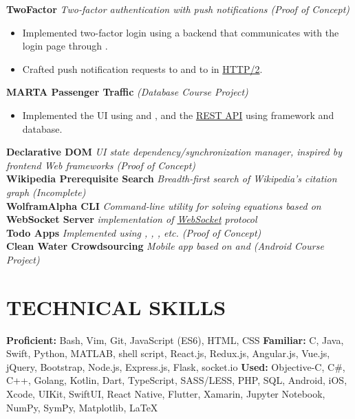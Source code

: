 \documentclass[11pt]{article}
\begin{document}
\vspace{0.5em}
%
\textbf{TwoFactor} \enspace \textit{Two-factor authentication with push notifications (Proof of Concept)}
\begin{itemize}[leftmargin=15pt, noitemsep, topsep=0pt]
\item Implemented two-factor login using a \underline{} backend that communicates with the login page through \underline{}.
\item Crafted push notification requests to \underline{} and to \underline{} in \underline{HTTP/2}.
\end{itemize}
\vspace{0.5em}
%
\textbf{MARTA Passenger Traffic} \enspace \textit{(Database Course Project)}
\begin{itemize}[leftmargin=15pt, noitemsep, topsep=0pt]
\item Implemented the UI using \underline{} and \underline{}, and the \underline{REST API} using \underline{} framework and \underline{} database.
\end{itemize}
\vspace{0.5em}
%
\textbf{Declarative DOM} \enspace \textit{UI state dependency/synchronization manager, inspired by frontend Web frameworks (Proof of Concept)}\\
\textbf{Wikipedia Prerequisite Search} \enspace \textit{Breadth-first search of Wikipedia's citation graph (Incomplete)}\\
\textbf{WolframAlpha CLI} \enspace \textit{Command-line utility for solving equations based on \underline{}}\\
\textbf{WebSocket Server}  \enspace \textit{\underline{} implementation of \underline{WebSocket} protocol}\\
\textbf{Todo Apps} \enspace \textit{Implemented using \underline{}\underline{}, \underline{}, \underline{}, etc. (Proof of Concept)}\\
\textbf{Clean Water Crowdsourcing}	\enspace \textit{Mobile app based on \underline{} and \underline{} (Android Course Project) }
\vspace{-0.5em}

\section*{TECHNICAL SKILLS}
\textbf{Proficient:} Bash, Vim, Git, JavaScript (ES6), HTML, CSS  \enspace\textbf{Familiar:} C, Java, Swift, Python, MATLAB, shell script, React.js, Redux.js, Angular.js, Vue.js, jQuery, Bootstrap, Node.js, Express.js, Flask, socket.io \enspace\textbf{Used:} Objective-C, C\#, C++, Golang, Kotlin, Dart, TypeScript, SASS/LESS, PHP, SQL, Android, iOS, Xcode, UIKit, SwiftUI, React Native, Flutter, Xamarin, Jupyter Notebook, NumPy, SymPy, Matplotlib, LaTeX
\end{document}
